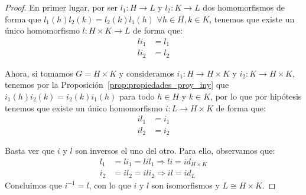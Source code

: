 \begin{teo}
   \begin{proof}
       En primer lugar, por ser $l_1:H\to L$ y $l_2:K\to L$ dos homomorfismos de forma que $l_1(h)l_2(k) = l_2(k)l_1(h)$ $\forall h\in H,k\in K$, tenemos que existe un único homomorfismo $l:H\times K\to L$ de forma que:
       \begin{align*}
           li_1 &= l_1 \\
           li_2 &= l_2
       \end{align*}
       \begin{figure}[H]
           \centering
       \end{figure}
       Ahora, si tomamos $G=H\times K$ y consideramos $i_1:H\to H\times K$ y $i_2:K\to H\times K$, tenemos por la Proposición~\ref{prop:propiedades_proy_iny} que $i_1(h)i_2(k) = i_2(k)i_1(h)$ para todo $h\in H$ y $k\in K$, por lo que por hipótesis tenemos que existe un único homomorfismo $i:L\to H\times K$ de forma que: 
       \begin{align*}
           il_1 &= i_1 \\
           il_2 &= i_2 
       \end{align*}
       \begin{figure}[H]
           \centering
       \end{figure}
       Basta ver que $i$ y $l$ son inversos el uno del otro. Para ello, observamos que:
       \begin{align*}
           l_1 &= li_1 = lil_1 \Longrightarrow li = id_{H\times K} \\
           i_2 &= il_2 = ili_2 \Longrightarrow il = id_L
       \end{align*}
       Concluimos que $i^{-1} = l$, con lo que $i$ y $l$ son isomorfismos y $L\cong H\times K$.
   \end{proof}
\end{teo}

